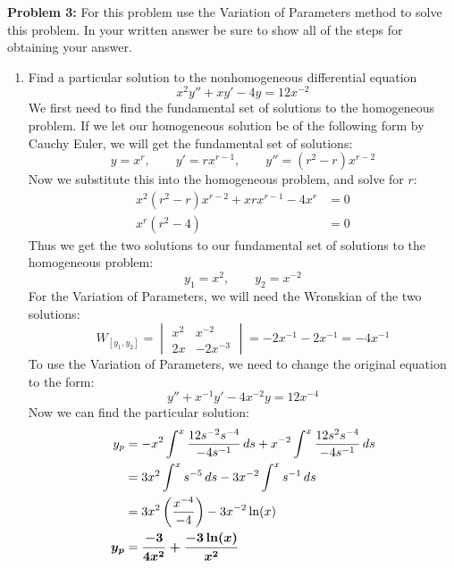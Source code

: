\documentclass[12pt]{article}
\begin{document}
\newpage 

\noindent \textbf{Problem 3: }For this problem use the Variation of Parameters method to solve this problem. In your written answer be sure to show all of the steps for obtaining your answer.
\\ 
	\begin{enumerate}[label = (\alph*)]
		\item Find a particular solution to the nonhomogeneous differential equation 
		$$
		x^2y'' + xy' - 4y = 12x^{-2}
		$$
		We first need to find the fundamental set of solutions to the homogeneous problem.  If we let our homogeneous solution be of the following form by Cauchy Euler, we will get the fundamental set of solutions:
			$$
			y = x^r, \qquad y' = rx^{r-1}, \qquad y'' = (r^2 - r)x^{r-2}
			$$
		Now we substitute this into the homogeneous problem, and solve for $r$:
			\begin{align*}
				x^2(r^2 - r)x^{r-2} + xrx^{r-1} - 4x^r &= 0 \\
				x^r(r^2 - 4) &= 0
			\end{align*}
		Thus we get the two solutions to our fundamental set of solutions to the homogeneous problem:
			$$
			y_1 = x^2, \qquad y_2 = x^{-2}
			$$
		For the Variation of Parameters, we will need the Wronskian of the two solutions:
		$$
		W_{[y_1,y_2]} = 
		\begin{vmatrix}
			x^2 & x^{-2} \\
			2x & -2x^{-3}
		\end{vmatrix}
		= -2x^{-1} - 2x^{-1} = -4x^{-1}
		$$
		To use the Variation of Parameters, we need to change the original equation to the form:
			$$
			y'' + x^{-1}y' - 4x^{-2}y = 12x^{-4}
			$$
		Now we can find the particular solution:
			\begin{align*}
				y_p &= -x^2 \int^x \frac{12s^{-2}s^{-4}}{-4s^{-1}}\,ds + x^{-2} \int^x \frac{12s^{2}s^{-4}}{-4s^{-1}}\,ds \\
				&= 3x^2 \int^x s^{-5}\,ds - 3x^{-2}\int^x s^{-1}\,ds \\
				&= 3x^2 \left(\frac{x^{-4}}{-4}\right) - 3x^{-2}\ln(x) \\
				\text{\boldmath $y_p$} &= \text{\boldmath $\frac{-3}{4x^2} + \frac{-3\ln(x)}{x^2}$}
 			\end{align*}
 			
 		\newpage 
 		

\end{enumerate}
\end{document}
